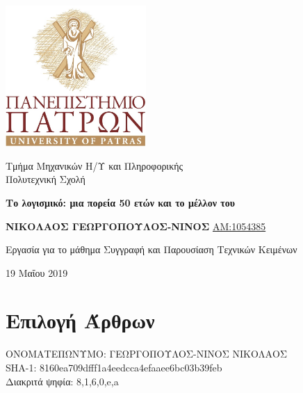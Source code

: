\documentclass[11pt]{article}
\begin{document}
	
	
	\begin{titlepage}
		\begin{center}
			\includegraphics[width=0.4\textwidth]{university}
			
			\vspace{0.1cm}
			
			\Large
			Τμήμα Μηχανικών Η/Υ και Πληροφορικής\\
			Πολυτεχνική Σχολή	
			
			\vspace{2.5cm}
			
			\huge
			\textbf{Το λογισμικό: μια πορεία 50 ετών και το μέλλον του}
			
			
			\vspace{4.0cm}
			\Large
			\textbf{ΝΙΚΟΛΑΟΣ ΓΕΩΡΓΟΠΟΥΛΟΣ-ΝΙΝΟΣ }
			\normalsize
			\underline{AM:1054385}
			
			\vfill
			Εργασία για το μάθημα Συγγραφή 
			και Παρουσίαση Τεχνικών Κειμένων
			
			\vspace{0.8cm}
			
			\Large
			19 Μαΐου 2019 
			
		\end{center}
	\end{titlepage}
	
	
	\section*{Επιλογή Άρθρων}
	ΟΝΟΜΑΤΕΠΩΝΥΜΟ: \hspace{3em} ΓΕΩΡΓΟΠΟΥΛΟΣ-ΝΙΝΟΣ ΝΙΚΟΛΑΟΣ \\
	\foreignlanguage{english}{SHA-1: \hspace{9.7em} 8160ea709dfff1a4eedcca4efaaee6bc03b39feb\\}
	Διακριτά ψηφία: \hspace{6.3em}  \foreignlanguage{english}{8,1,6,0,e,a}
	
\end{document}
